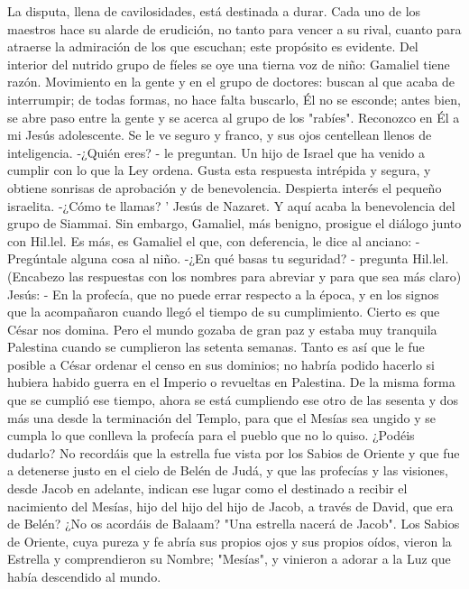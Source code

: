\documentclass[12pt]{book} %
\begin{document}
La disputa, llena de cavilosidades, está destinada a durar. Cada uno de los maestros hace su alarde de erudición, no 
tanto para vencer a su rival, cuanto para atraerse la admiración de los que escuchan; este propósito es evidente. Del interior del nutrido grupo de fíeles se oye una tierna voz de niño: 
Gamaliel tiene razón.             
Movimiento en la gente y en el grupo de doctores: buscan al que acaba de interrumpir; de todas formas, no hace falta 
buscarlo, Él no se esconde; antes bien, se abre paso entre la gente y se acerca al grupo de los "rabíes". Reconozco en Él a mi Jesús adolescente. Se le ve seguro y franco, y sus ojos centellean llenos de inteligencia. 
-¿Quién eres? - le preguntan. 
Un hijo de Israel que ha venido a cumplir con lo que la Ley ordena. 
Gusta esta respuesta intrépida y segura, y obtiene sonrisas de aprobación y de benevolencia. Despierta interés el 
pequeño israelita. 
-¿Cómo te llamas?                  ' 
Jesús de Nazaret. 
Y aquí acaba la benevolencia del grupo de Siammai. Sin embargo, Gamaliel, más benigno, prosigue el diálogo junto con Hil.lel. Es más, es Gamaliel el que, con deferencia, le dice al anciano: 
- Pregúntale alguna cosa al niño. 
-¿En qué basas tu seguridad? - pregunta Hil.lel. 
(Encabezo las respuestas con los nombres para abreviar y para que sea más claro) 
Jesús: - En la profecía, que no puede errar respecto a la época, y en los signos que la acompañaron cuando llegó el tiempo de su cumplimiento. Cierto es que César nos domina. Pero el mundo gozaba de gran paz y estaba muy tranquila Palestina cuando se cumplieron las setenta semanas. Tanto es así que le fue posible a César ordenar el censo en sus dominios; no habría podido hacerlo si hubiera habido guerra en el Imperio o revueltas en Palestina. De la misma forma que se cumplió ese tiempo, ahora se está cumpliendo ese otro de las sesenta y dos más una desde la terminación del Templo, para que el Mesías sea ungido y se cumpla lo que conlleva la profecía para el pueblo que no lo quiso. ¿Podéis dudarlo? No recordáis que la estrella fue vista por los Sabios de Oriente y que fue a detenerse justo en el cielo de Belén de Judá, y que las profecías y las visiones, desde Jacob en adelante, indican ese lugar como el destinado a recibir el nacimiento del Mesías, hijo del hijo del hijo de Jacob, a través de David, que era de Belén? ¿No os acordáis de Balaam? "Una estrella nacerá de Jacob". Los Sabios de Oriente, cuya pureza y fe abría sus propios ojos y sus propios oídos, vieron la Estrella y comprendieron su Nombre; "Mesías", y vinieron a adorar a la Luz que había descendido al mundo. 
\end{document}
